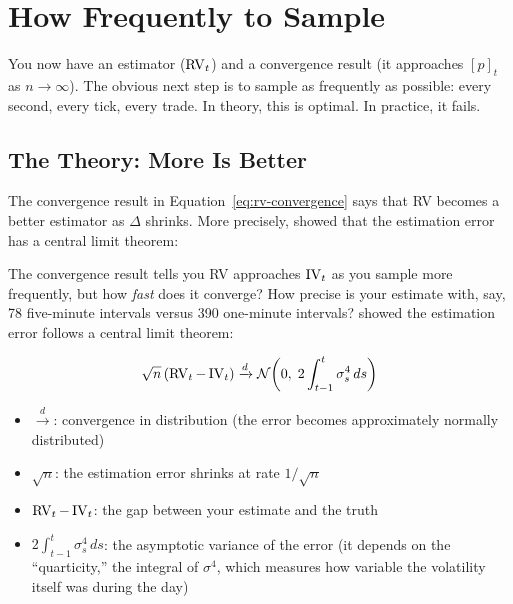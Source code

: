 \section{How Frequently to Sample}
\label{sec:sampling-frequency}

You now have an estimator ($\operatorname{RV}_t$) and a convergence result (it approaches $[p]_t$ as $n \to \infty$).
The obvious next step is to sample as frequently as possible: every second, every tick, every trade.
In theory, this is optimal.
In practice, it fails.

\subsection{The Theory: More Is Better}

The convergence result in Equation~\eqref{eq:rv-convergence} says that RV becomes a better estimator as $\Delta$ shrinks.
More precisely, \citet{BNS2002} showed that the estimation error has a central limit theorem:

The convergence result tells you RV approaches $\operatorname{IV}_t$ as you sample more frequently, but how \emph{fast} does it converge?
How precise is your estimate with, say, 78 five-minute intervals versus 390 one-minute intervals?
\citet{BNS2002} showed the estimation error follows a central limit theorem:

\begin{equation}
  \sqrt{n}\,(\operatorname{RV}_t - \operatorname{IV}_t) \xrightarrow{d} \mathcal{N}\!\left(0,\; 2\int_{t-1}^{t}\sigma^4_s\,ds\right)
  \label{eq:rv-clt}
\end{equation}
\begin{itemize}[nosep]
  \item $\xrightarrow{d}$: convergence in distribution (the error becomes approximately normally distributed)
  \item $\sqrt{n}$: the estimation error shrinks at rate $1/\sqrt{n}$
  \item $\operatorname{RV}_t - \operatorname{IV}_t$: the gap between your estimate and the truth
  \item $2\int_{t-1}^{t}\sigma^4_s\,ds$: the asymptotic variance of the error (it depends on the ``quarticity,'' the integral of $\sigma^4$, which measures how variable the volatility itself was during the day)
\end{itemize}

